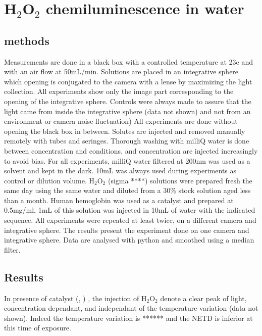 
\section{H$_2$O$_2$ chemiluminescence in water}

\subsection{methods}
Measurements are done in a black box with a controlled temperature at 23\°c and with an air flow at 50mL/min.
Solutions are placed in an integrative sphere which opening is conjugated to the camera with a lense by maximizing the light collection. All experiments show only the image part corresponding to the opening of the integrative sphere. Controls were always made to assure that the light came from inside the integrative sphere (data not shown) and not from an environment or camera noise fluctuation)
All experiments are done without opening the black box in between. Solutes are injected and removed manually remotely with tubes and seringes.
Thorough washing with milliQ water is done between concentration and conditions, and concentration are injected increasingly to avoid bias.
For all experiments, milliQ water filtered at 200nm was used as a solvent and kept in the dark. 10mL was always used during experiments as control or dilution volume. 
H$_2$O$_2$ (sigma ****) solutions were prepared fresh the same day using the same water and diluted from a 30\% stock solution aged less than a month.
Human hemoglobin was used as a catalyst and prepared at 0.5mg/ml, 1mL of this solution was injected in 10mL of water with the indicated sequence. 
All experiments were repeated at least twice, on a different camera and integrative sphere. The results present the experiment done on one camera and integrative sphere.
Data are analysed with python and smoothed using a median filter.

\subsection{Results}
In presence of catalyst (, ) , the injection of H$_2$O$_2$ denote a clear peak of light, concentration dependant, and independant of the temperature variation (data not shown). Indeed the temperature variation is \pm ******* and the NETD is inferior at this time of exposure.

